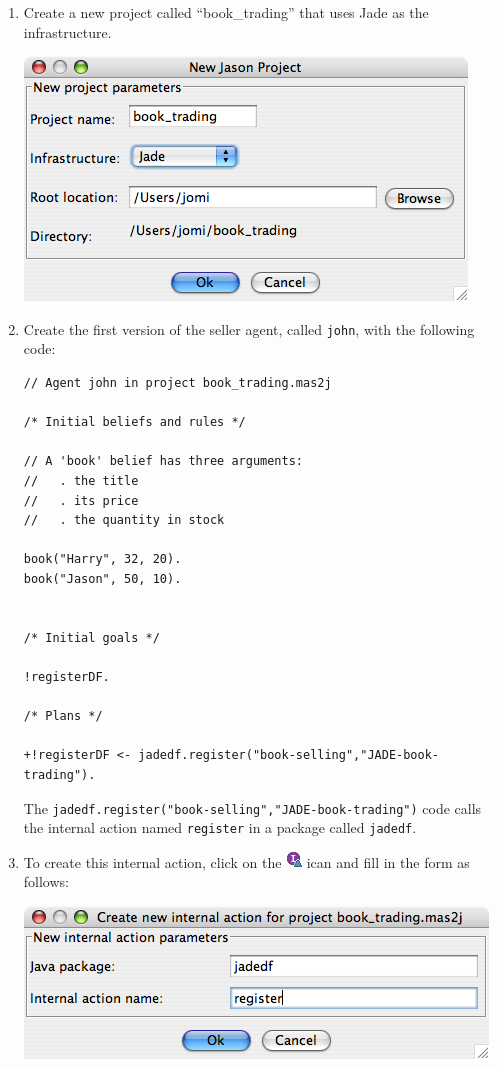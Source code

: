\documentclass[a4paper]{article}
\begin{document}
\begin{enumerate}
\item Create a new project called ``book_trading'' that uses Jade as
  the infrastructure.
  
  \includegraphics{figures/screen-create-project.png}

\item Create the first version of the seller agent, called
  \texttt{john}, with the following code:

\begin{verbatim}
// Agent john in project book_trading.mas2j

/* Initial beliefs and rules */

// A 'book' belief has three arguments:
//   . the title
//   . its price
//   . the quantity in stock

book("Harry", 32, 20).
book("Jason", 50, 10).


/* Initial goals */

!registerDF.

/* Plans */

+!registerDF <- jadedf.register("book-selling","JADE-book-trading").
\end{verbatim}

  The \texttt{jadedf.register("book-selling","JADE-book-trading")}
  code calls the internal action named \texttt{register} in a package
  called \texttt{jadedf}.

\item To create this internal action, click on
  the \includegraphics{figures/createIA.gif} ican and fill in the form
  as follows:

  \includegraphics{figures/screen-create-ia.png}


\end{enumerate}
\end{document}
